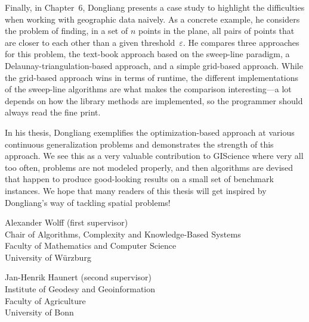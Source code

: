 {Finally, in Chapter~6, Dongliang presents a case study to highlight
the difficulties when working with geographic data naively.  As a
concrete example, he considers the problem of finding, in a set of
$n$ points in the plane, all pairs of points that are closer to each
other than a given threshold~$\varepsilon$.  He compares three
approaches for this problem, the text-book approach based on the
sweep-line paradigm, a Delaunay-triangulation-based approach, and a
simple grid-based approach.  While the grid-based approach wins in
terms of runtime, the different implementations of the sweep-line
algorithms are what makes the comparison interesting---a lot
depends on how the library methods are implemented, 
so the programmer should always read the fine print.

In his thesis, Dongliang exemplifies the optimization-based approach
at various continuous generalization problems and demonstrates the
strength of this approach.  We see this as a very valuable
contribution to GIScience where very all too often, problems are not
modeled properly, and then algorithms are devised that happen to
produce good-looking results on a small set of benchmark instances.
We hope that many readers of this thesis will get inspired by
Dongliang's way of tackling spatial problems!

\bigskip
\bigskip


\noindent
Alexander Wolff (first supervisor)\\
Chair of Algorithms, 
Complexity and Knowledge-Based Systems\\
Faculty of Mathematics and Computer Science\\
University of W\"urzburg

\bigskip

\noindent
Jan-Henrik Haunert (second supervisor)\\
Institute of Geodesy and Geoinformation\\
Faculty of Agriculture\\
University of Bonn
}


